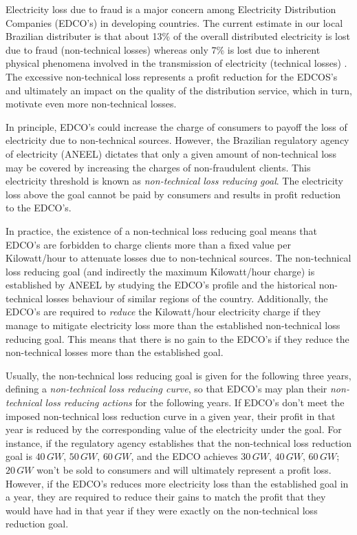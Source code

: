 Electricity loss due to fraud is a major concern among Electricity Distribution Companies (EDCO's) in developing countries. 
The current estimate in our local Brazilian distributer is that about 13\% of the overall distributed electricity is lost due to fraud (non-technical losses)
whereas only 7\% is lost due to inherent physical phenomena involved in the transmission of electricity (technical losses) \cite{ANEEL2012}. 
The excessive non-technical loss represents a profit reduction for the
EDCOS's and ultimately an impact on the quality of the distribution service, which in turn, motivate even more non-technical losses.

In principle, EDCO's could increase the charge of consumers to payoff the loss of electricity due to non-technical sources.
However, the Brazilian regulatory agency of electricity (ANEEL) dictates that only a given amount of non-technical loss
may be covered by increasing the charges of non-fraudulent clients. 
This electricity threshold is known as \textit{non-technical loss reducing goal}.
The electricity loss above the goal cannot be paid by consumers and results in 
profit reduction to the EDCO's.

In practice, the existence of a non-technical loss reducing goal means that EDCO's are forbidden to charge clients more than a fixed value per Kilowatt/hour to
attenuate losses due to non-technical sources.
The non-technical loss reducing goal (and indirectly the maximum Kilowatt/hour charge) is established by ANEEL by studying the EDCO's 
profile and the historical non-technical losses behaviour of similar regions of the country.
Additionally, the EDCO's are required to \textit{reduce} the Kilowatt/hour electricity charge if they manage to mitigate
electricity loss more than the established non-technical loss reducing goal. 
This means that there is no gain to the EDCO's if they reduce the non-technical losses more than the established goal.

Usually, the non-technical loss reducing goal is given for the following three years,
defining a \textit{non-technical loss reducing curve},
so that EDCO's may plan their \textit{non-technical loss reducing actions} for the
following years.
If EDCO's don't meet the imposed non-technical loss reduction curve in a given year, their profit in that year
is reduced by the corresponding value of the electricity under the goal. For instance, if the regulatory
agency establishes that the non-technical loss reduction goal is $40\,GW$, $50\,GW$, $60\,GW$, and the EDCO achieves $30\,GW$, $40\,GW$, $60\,GW$;
$20\,GW$ won't be sold to consumers and will ultimately represent a profit loss.
However, if the EDCO's reduces more electricity loss than the established goal in a year,
they are required to reduce their gains to match the profit that they would have had in that year if they were exactly
on the non-technical loss reduction goal.


